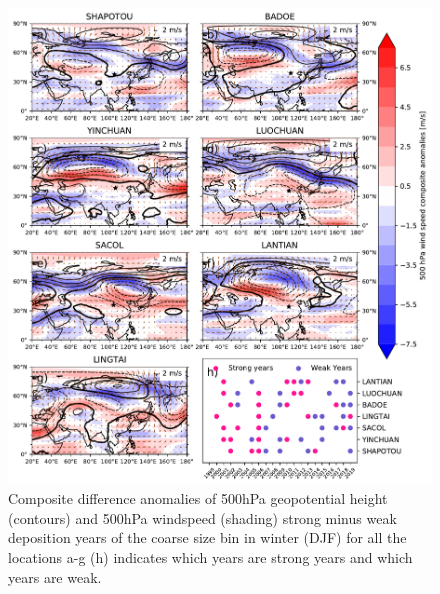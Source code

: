\begin{figure}[hptb]
    \centering
    \includegraphics[width=\columnwidth]{texfiles/figs/20micrion_DJF_ws_geopot_500hPa.pdf}
    \caption{Composite difference anomalies of 500hPa geopotential height (contours) and 500hPa windspeed (shading) strong minus weak deposition years of the coarse size bin in winter (DJF) for all the locations a-g  (h) indicates which years are strong years and which years are weak.}
    \label{fig:DJF_500hPa_coarse_composite}
\end{figure}

